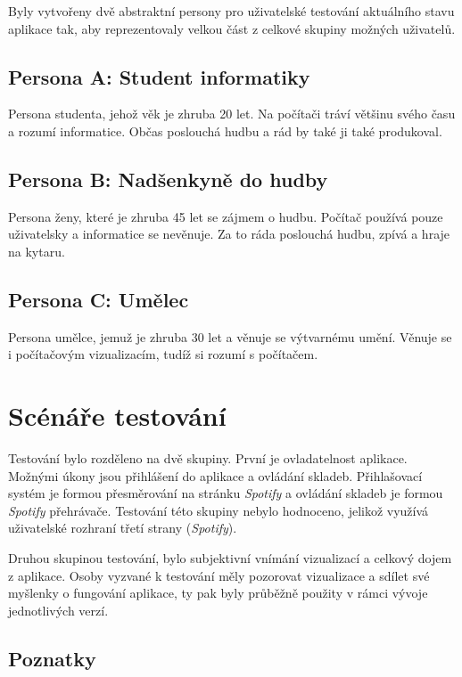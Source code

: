 \documentclass[thesis=B, czech]{FITthesis}[2019/03/06]
\begin{document}
Byly vytvořeny dvě abstraktní persony pro uživatelské testování aktuálního stavu aplikace tak, aby reprezentovaly velkou část z celkové skupiny možných uživatelů.

\subsection*{Persona A: Student informatiky}

Persona studenta, jehož věk je zhruba 20 let. Na počítači tráví většinu svého času a rozumí informatice. Občas poslouchá hudbu a rád by také ji také produkoval.

\subsection*{Persona B: Nadšenkyně do hudby}

Persona ženy, které je zhruba 45 let se zájmem o hudbu. Počítač používá pouze uživatelsky a informatice se nevěnuje. Za to ráda poslouchá hudbu, zpívá a hraje na kytaru.

\subsection*{Persona C: Umělec}

Persona umělce, jemuž je zhruba 30 let a věnuje se výtvarnému umění. Věnuje se i počítačovým vizualizacím, tudíž si rozumí s počítačem.

\section{Scénáře testování}

Testování bylo rozděleno na dvě skupiny. První je ovladatelnost aplikace. Možnými úkony jsou přihlášení do aplikace a ovládání skladeb. Přihlašovací systém je formou přesměrování na stránku \textit{Spotify} a ovládání skladeb je formou \textit{Spotify} přehrávače. Testování této skupiny nebylo hodnoceno, jelikož využívá uživatelské rozhraní třetí strany (\textit{Spotify}). 

Druhou skupinou testování, bylo subjektivní vnímání vizualizací a celkový dojem z aplikace. Osoby vyzvané k testování měly pozorovat vizualizace a sdílet své myšlenky o fungování aplikace, ty pak byly průběžně použity v rámci vývoje jednotlivých verzí.


\subsection*{Poznatky}
\end{document}
